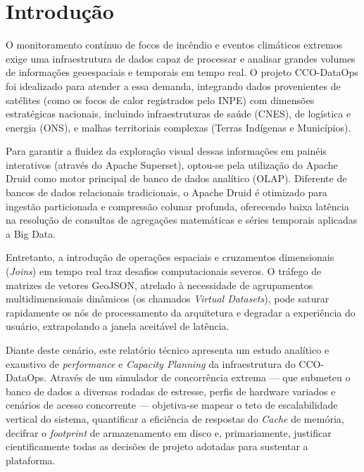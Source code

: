 \section{Introdução}

O monitoramento contínuo de focos de incêndio e eventos climáticos extremos exige uma infraestrutura de dados capaz de processar e analisar grandes volumes de informações geoespaciais e temporais em tempo real. O projeto CCO-DataOps foi idealizado para atender a essa demanda, integrando dados provenientes de satélites (como os focos de calor registrados pelo INPE) com dimensões estratégicas nacionais, incluindo infraestruturas de saúde (CNES), de logística e energia (ONS), e malhas territoriais complexas (Terras Indígenas e Municípios).

Para garantir a fluidez da exploração visual dessas informações em painéis interativos (através do Apache Superset), optou-se pela utilização do Apache Druid como motor principal de banco de dados analítico (OLAP). Diferente de bancos de dados relacionais tradicionais, o Apache Druid é otimizado para ingestão particionada e compressão colunar profunda, oferecendo baixa latência na resolução de consultas de agregações matemáticas e séries temporais aplicadas a Big Data.

Entretanto, a introdução de operações espaciais e cruzamentos dimensionais (\textit{Joins}) em tempo real traz desafios computacionais severos. O tráfego de matrizes de vetores GeoJSON, atrelado à necessidade de agrupamentos multidimensionais dinâmicos (os chamados \textit{Virtual Datasets}), pode saturar rapidamente os nós de processamento da arquitetura e degradar a experiência do usuário, extrapolando a janela aceitável de latência.

Diante deste cenário, este relatório técnico apresenta um estudo analítico e exaustivo de \textit{performance} e \textit{Capacity Planning} da infraestrutura do CCO-DataOps. Através de um simulador de concorrência extrema --- que submeteu o banco de dados a diversas rodadas de estresse, perfis de hardware variados e cenários de acesso concorrente --- objetiva-se mapear o teto de escalabilidade vertical do sistema, quantificar a eficiência de respostas do \textit{Cache} de memória, decifrar o \textit{footprint} de armazenamento em disco e, primariamente, justificar cientificamente todas as decisões de projeto adotadas para sustentar a plataforma.
